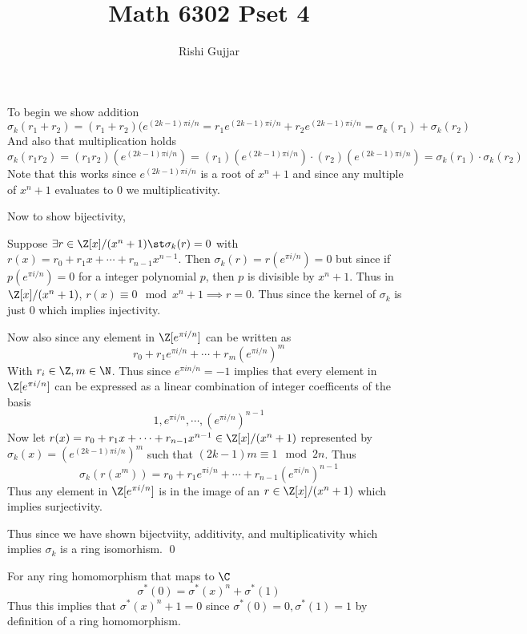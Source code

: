 \documentclass[12pt]{amsart}
\title{Math 6302 Pset 4}
\author{Rishi Gujjar}
\begin{document}
  \maketitle
  \begin{problem}
    \begin{subproblem}
      To begin we show addition 
      \[\sigma_k(r_1+r_2) = (r_1+r_2)(e^{(2k-1)\pi i/n} = r_1e^{(2k-1)\pi i/n} + r_2 e^{(2k-1)\pi i/n} = \sigma_k(r_1)+\sigma_k(r_2)\]
      And also that multiplication holds
      \[\sigma_k(r_1r_2) = (r_1r_2)(e^{(2k-1)\pi i/n}) = (r_1)(e^{(2k-1)\pi i/n})\cdot (r_2)(e^{(2k-1)\pi i/n}) = \sigma_k(r_1)\cdot \sigma_k(r_2)\]
      Note that this works since $e^{(2k-1)\pi i/n}$ is a root of $x^n+1$ and since any multiple of $x^n+1$ evaluates to 0 we multiplicativity.

      Now to show bijectivity, 

      Suppose $\exists r\in \Z[x]/(x^n+1)\st \sigma_k(r)=0$ with $r(x)=r_0 + r_1 x +\cdots + r_{n-1}x^{n-1}$. Then 
      $\sigma_k(r) = r (e^{\pi i /n}) = 0$ but since if $p(e^{\pi i/n}) = 0$ for a integer polynomial $p$, then $p$ is divisible by $x^n+1$. Thus in $\Z[x]/(x^n+1)$, $r(x)\equiv 0\mod x^n+1\implies r=0$. Thus since the kernel of $\sigma_k$ is just 0 which implies injectivity.

      Now also since any element in $\Z[e^{\pi i/n}]$ can be written as 
      \[r_0 + r_1 e^{\pi i/n} + \cdots + r_m(e^{\pi i/n})^m\]
      With $r_i\in \Z, m\in \N$. Thus since $e^{\pi i n/n } = -1$ implies that every element in $\Z[e^{\pi i /n}]$ can be expressed as a linear combination of integer coefficents of the basis 
      \[1, e^{\pi i/n}, \cdots, (e^{\pi i/n})^{n-1}\]
      Now let $r(x)=r_0 + r_1x +\cdots + r_{n-1}x^{n-1}\in \Z[x]/(x^n+1)$ represented by 
      $\sigma_k(x)=(e^{(2k-1)\pi i/n})^m$ such that $(2k-1)m\equiv 1\mod 2n$.
      Thus \[\sigma_k(r(x^m)) =r_0 + r_1 e^{\pi i /n} + \cdots + r_{n-1} (e^{\pi i/n})^{n-1}\]
      Thus any element in $\Z[e^{\pi i/n}]$ is in the image of an $r\in \Z[x]/(x^n+1)$ which implies surjectivity.

      Thus since we have shown bijectviity,  additivity, and multiplicativity which implies $\sigma_k$ is a ring isomorhism. \qed
    \end{subproblem}
    \begin{subproblem}
      For any ring homomorphism that maps to $\C$ 
      \[\sigma^*(0)=\sigma^*(x)^n+\sigma^*(1)\]
      Thus this implies that $\sigma^*(x)^n + 1 = 0$ since $\sigma^*(0)=0, \sigma^*(1)=1$ by definition of a ring homomorphism. 


\end{subproblem}
\end{problem}
\end{document}
